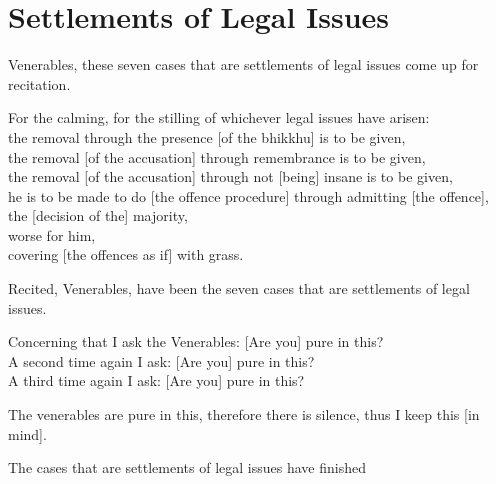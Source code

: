 
\section{Settlements of Legal Issues}
\label{settlements}

\begin{intro}
	Venerables, these seven cases that are settlements of legal issues come up for recitation.
\end{intro}

\begin{center}
For the calming, for the stilling of whichever legal issues have arisen:\\
the removal through the presence [of the bhikkhu] is to be given,\\
the removal [of the accusation] through remembrance is to be given,\\
the removal [of the accusation] through not [being] insane is to be given,\\
he is to be made to do [the offence procedure] through admitting [the offence],\\
the [decision of the] majority,\\
 worse for him,\\
 covering [the offences as if] with grass.
\end{center}

\medskip

\begin{center}
	Recited, Venerables, have been the seven cases that are settlements of legal issues.

	\smallskip

	Concerning that I ask the Venerables: [Are you] pure in this?\\
	A second time again I ask: [Are you] pure in this?\\
	A third time again I ask: [Are you] pure in this?

	\smallskip

	The venerables are pure in this, therefore there is silence, thus I keep this [in mind].
\end{center}

\begin{outro}
	The cases that are settlements of legal issues have finished
\end{outro}

\clearpage

